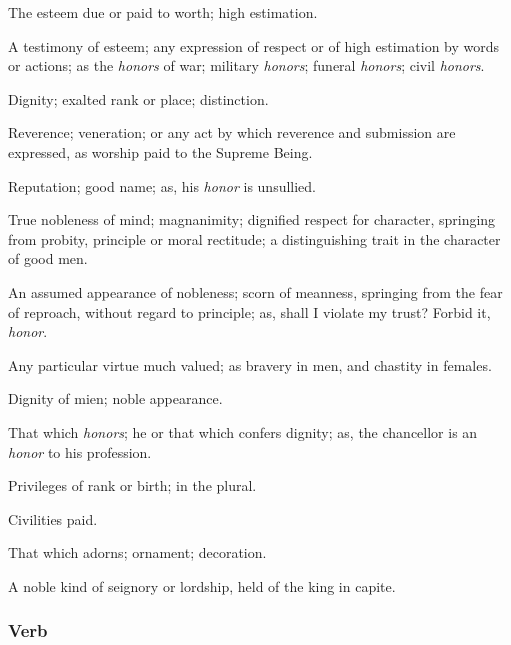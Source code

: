 		\begin{compactitem}
			\item[1] The esteem due or paid to worth; high estimation.
			\item[2] A testimony of esteem; any expression of respect or of high estimation by words or actions; as the \textit{honors} of war; military \textit{honors}; funeral \textit{honors}; civil \textit{honors}.
			\item[3] Dignity; exalted rank or place; distinction.
			\item[4] Reverence; veneration; or any act by which reverence and submission are expressed, as worship paid to the Supreme Being.
			\item[5] Reputation; good name; as, his \textit{honor} is unsullied.
			\item[6] True nobleness of mind; magnanimity; dignified respect for character, springing from probity, principle or moral rectitude; a distinguishing trait in the character of good men.
			\item[7] An assumed appearance of nobleness; scorn of meanness, springing from the fear of reproach, without regard to principle; as, shall I violate my trust? Forbid it, \textit{honor}.
			\item[8] Any particular virtue much valued; as bravery in men, and chastity in females.
			\item[9] Dignity of mien; noble appearance.
			\item[10] That which \textit{honors}; he or that which confers dignity; as, the chancellor is an \textit{honor} to his profession.
			\item[11] Privileges of rank or birth; in the plural.
			\item[12] Civilities paid.
			\item[13] That which adorns; ornament; decoration.
			\item[14] A noble kind of seignory or lordship, held of the king in capite.
		\end{compactitem}
		
	\subsubsection{Verb}

